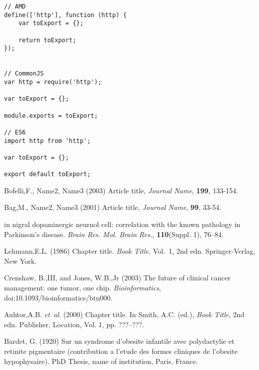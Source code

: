 \documentclass{bioinfo}
\begin{document}
\begin{lstlisting}
// AMD
define(['http'], function (http) {
    var toExport = {};

    return toExport;
});


// CommonJS
var http = require('http');

var toExport = {};

module.exports = toExport;

// ES6
import http from 'http';

var toExport = {};

export default toExport;
\end{lstlisting}
%
%
%
%
%
%
%
%
%

\begin{thebibliography}{}
 Bofelli,F., Name2, Name3 (2003) Article title, {\it Journal Name}, {\bf 199}, 133-154.

 Bag,M., Name2, Name3 (2001) Article title, {\it Journal Name}, {\bf 99}, 33-54.

in nigral dopaminergic neurnol cell: correlation with the known
pathology in Parkinson's disease. \textit{Brain Res. Mol. Brain
Res.}, \textbf{110}(Suppl. 1), 76--84.

Lehmann,E.L. (1986) Chapter title. \textit{Book Title}. Vol.~1, 2nd edn. Springer-Verlag, New York.

Crenshaw, B.,III, and Jones, W.B.,Jr (2003) The future of clinical
cancer management: one tumor, one chip. \textit{Bioinformatics},
doi:10.1093/bioinformatics/btn000.

Auhtor,A.B. \textit{et~al}. (2000) Chapter title. In Smith, A.C.
(ed.), \textit{Book Title}, 2nd edn. Publisher, Location, Vol. 1, pp.
???--???.

Bardet, G. (1920) Sur un syndrome d'obesite infantile avec
polydactylie et retinite pigmentaire (contribution a l'etude des
formes cliniques de l'obesite hypophysaire). PhD Thesis, name of
institution, Paris, France.

\end{thebibliography}
\end{document}
